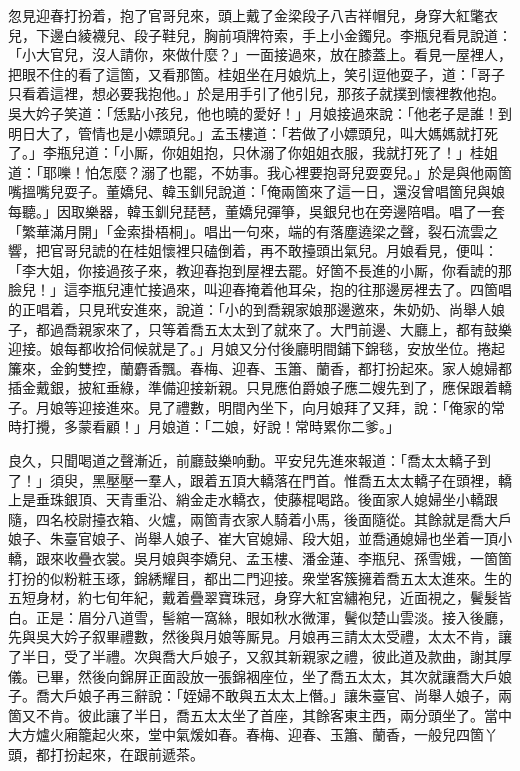 忽見迎春打扮着，抱了官哥兒來，頭上戴了金梁段子八吉祥帽兒，身穿大紅氅衣兒，下邊白綾襪兒、段子鞋兒，胸前項牌符索，手上小金鐲兒。李瓶兒看見說道：「小大官兒，沒人請你，來做什麼？」一面接過來，放在膝蓋上。看見一屋裡人，把眼不住的看了這箇，又看那箇。桂姐坐在月娘炕上，笑引逗他耍子，道：「哥子只看着這裡，想必要我抱他。」於是用手引了他引兒，那孩子就撲到懷裡教他抱。吳大妗子笑道：「恁點小孩兒，他也曉的愛好！」月娘接過來說：「他老子是誰！到明日大了，管情也是小嫖頭兒。」孟玉樓道：「若做了小嫖頭兒，叫大媽媽就打死了。」李瓶兒道：「小厮，你姐姐抱，只休溺了你姐姐衣服，我就打死了！」桂姐道：「耶嚛！怕怎麼？溺了也罷，不妨事。我心裡要抱哥兒耍耍兒。」於是與他兩箇嘴搵嘴兒耍子。董嬌兒、韓玉釧兒說道：「俺兩箇來了這一日，還沒曾唱箇兒與娘每聽。」因取樂器，韓玉釧兒琵琶，董嬌兒彈箏，吳銀兒也在旁邊陪唱。唱了一套「繁華滿月開」「金索掛梧桐」。唱出一句來，端的有落塵遶梁之聲，裂石流雲之響，把官哥兒諕的在桂姐懷裡只磕倒着，再不敢擡頭出氣兒。月娘看見，便叫：「李大姐，你接過孩子來，教迎春抱到屋裡去罷。好箇不長進的小厮，你看諕的那臉兒！」這李瓶兒連忙接過來，叫迎春掩着他耳朵，抱的往那邊房裡去了。四箇唱的正唱着，只見玳安進來，說道：「小的到喬親家娘那邊邀來，朱奶奶、尚舉人娘子，都過喬親家來了，只等着喬五太太到了就來了。大門前邊、大廳上，都有鼓樂迎接。娘每都收拾伺候就是了。」月娘又分付後廳明間鋪下錦毯，安放坐位。捲起簾來，金鉤雙控，蘭麝香飄。春梅、迎春、玉簫、蘭香，都打扮起來。家人媳婦都插金戴銀，披紅垂綠，準備迎接新親。只見應伯爵娘子應二嫂先到了，應保跟着轎子。月娘等迎接進來。見了禮數，明間內坐下，向月娘拜了又拜，說：「俺家的常時打攪，多蒙看顧！」月娘道：「二娘，好說！常時累你二爹。」

良久，只聞喝道之聲漸近，前廳鼓樂响動。平安兒先進來報道：「喬太太轎子到了！」須臾，黑壓壓一羣人，跟着五頂大轎落在門首。惟喬五太太轎子在頭裡，轎上是垂珠銀頂、天青重沿、綃金走水轎衣，使藤棍喝路。後面家人媳婦坐小轎跟隨，四名校尉擡衣箱、火爐，兩箇青衣家人騎着小馬，後面隨從。其餘就是喬大戶娘子、朱臺官娘子、尚舉人娘子、崔大官媳婦、段大姐，並喬通媳婦也坐着一頂小轎，跟來收疊衣裳。吳月娘與李嬌兒、孟玉樓、潘金蓮、李瓶兒、孫雪娥，一箇箇打扮的似粉粧玉琢，錦綉耀目，都出二門迎接。衆堂客簇擁着喬五太太進來。生的五短身材，約七旬年紀，戴着疊翠寶珠冠，身穿大紅宮繡袍兒，近面視之，鬢髮皆白。正是：眉分八道雪，髻綰一窩絲，眼如秋水微渾，鬢似楚山雲淡。接入後廳，先與吳大妗子叙畢禮數，然後與月娘等厮見。月娘再三請太太受禮，太太不肯，讓了半日，受了半禮。次與喬大戶娘子，又叙其新親家之禮，彼此道及款曲，謝其厚儀。已畢，然後向錦屏正面設放一張錦裀座位，坐了喬五太太，其次就讓喬大戶娘子。喬大戶娘子再三辭說：「姪婦不敢與五太太上僭。」讓朱臺官、尚舉人娘子，兩箇又不肯。彼此讓了半日，喬五太太坐了首座，其餘客東主西，兩分頭坐了。當中大方爐火廂籠起火來，堂中氣煖如春。春梅、迎春、玉簫、蘭香，一般兒四箇丫頭，都打扮起來，在跟前遞茶。

